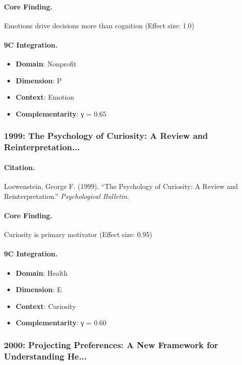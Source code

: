 \paragraph{Core Finding.}
Emotions drive decisions more than cognition (Effect size: 1.0)

\paragraph{9C Integration.}
\begin{itemize}[nosep]
  \item \textbf{Domain}: Nonprofit
  \item \textbf{Dimension}: P
  \item \textbf{Context}: Emotion
  \item \textbf{Complementarity}: γ = 0.65
\end{itemize}

\subsubsection{1999: The Psychology of Curiosity: A Review and Reinterpretation...}

\paragraph{Citation.}
Loewenstein, George F. (1999). ``The Psychology of Curiosity: A Review and Reinterpretation.''
\textit{Psychological Bulletin}.

\paragraph{Core Finding.}
Curiosity is primary motivator (Effect size: 0.95)

\paragraph{9C Integration.}
\begin{itemize}[nosep]
  \item \textbf{Domain}: Health
  \item \textbf{Dimension}: E
  \item \textbf{Context}: Curiosity
  \item \textbf{Complementarity}: γ = 0.60
\end{itemize}

\subsubsection{2000: Projecting Preferences: A New Framework for Understanding He...}

